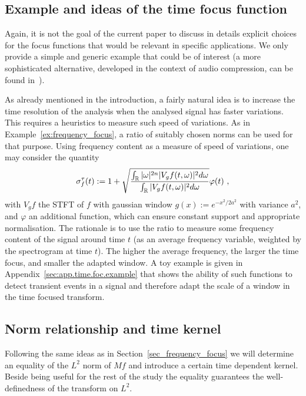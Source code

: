 \subsection{Example and ideas of the time focus function}\label{ssec_time_focus_function}
Again, it is not the goal of the current paper to discuss in details explicit choices for the focus functions that would be relevant in specific applications. We only provide a simple and generic example that could be of interest (a more sophisticated alternative, developed in the context of audio compression, can be found in~\cite{Molla2004determining}).
\begin{example}
\label{ex:time_focus}
As already mentioned in the introduction, a fairly natural idea is to increase the time resolution of the analysis when the analysed signal has faster variations. This requires a heuristics to measure such speed of variations. As in Example~\ref{ex:frequency_focus}, a ratio of suitably chosen norms can be used for that purpose. Using frequency content as a measure of speed of variations, one may consider the quantity 
\begin{equation}\label{eq_def2_sigma_tau}
	\sigma_{f}^\tau(t) := 1 + \sqrt{\frac{\int_\R |\omega|^{2n} |V_g f(t,\omega)|^2 d\omega}{\int_\R |V_g f(t,\omega)|^2d\omega}}\varphi(t)\ ,
\end{equation}
with $V_gf$ the STFT of $f$ with gaussian window $g(x):=e^{-x^2/2a^2}$ with variance $a^2$, and $\varphi$ an additional function, which can ensure constant support and appropriate normalisation. The rationale is to use the ratio to measure some frequency content of the signal around time $t$ (as an average frequency variable, weighted by the spectrogram at time $t$). The higher the average frequency, the larger the time focus, and smaller the adapted window. A toy example is given in Appendix~\ref{sec:app.time.foc.example} that shows the ability of such functions to detect transient events in a signal and therefore adapt the scale of a window in the time focused transform.

\end{example}

\subsection{Norm relationship and time kernel}

Following the same ideas as in Section~\ref{sec_frequency_focus} we will determine an equality of the $L^2$ norm of $Mf$ and introduce a certain time dependent kernel. Beside being useful for the rest of the study the equality guarantees the well-definedness of the transform on $L^2$.


